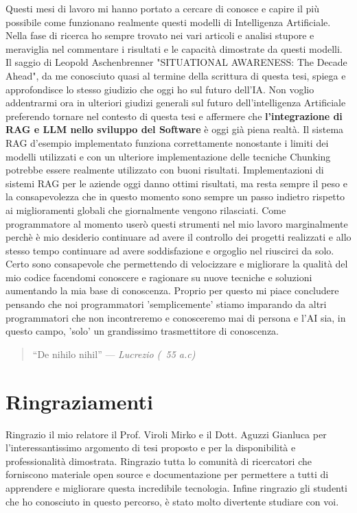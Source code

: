 \documentclass[12pt,a4paper,openright,twoside]{book}
\begin{document}
Questi mesi di lavoro mi hanno portato a cercare di conosce e capire il più possibile come funzionano realmente questi modelli di Intelligenza Artificiale.
Nella fase di ricerca ho sempre trovato nei vari articoli e analisi stupore e meraviglia nel commentare i risultati e le capacità dimostrate da questi modelli.
Il saggio di Leopold Aschenbrenner \cite{Aschenbrenner2024} "SITUATIONAL AWARENESS: The Decade Ahead", da me conosciuto quasi al termine della scrittura di questa tesi, spiega e approfondisce lo stesso giudizio che oggi ho sul futuro dell'IA.
Non voglio addentrarmi ora in ulteriori giudizi generali sul futuro dell'intelligenza Artificiale preferendo tornare nel contesto di questa tesi e affermere che \textbf{l'integrazione di RAG e LLM nello sviluppo del Software} è oggi già piena realtà.
Il sistema RAG d'esempio implementato funziona correttamente nonostante i limiti dei modelli utilizzati e con un ulteriore implementazione delle tecniche Chunking potrebbe essere realmente utilizzato con buoni risultati.
Implementazioni di sistemi RAG per le aziende oggi danno ottimi risultati,
ma resta sempre il peso e la consapevolezza che in questo momento sono sempre un passo indietro rispetto ai miglioramenti globali che
giornalmente vengono rilasciati.
Come programmatore al momento userò questi strumenti nel mio lavoro marginalmente perchè è mio desiderio continuare ad avere il controllo dei progetti realizzati e allo stesso tempo continuare ad avere soddisfazione e orgoglio nel riuscirci da solo.
Certo sono consapevole che permettendo di velocizzare e migliorare la qualità del mio codice facendomi conoscere e ragionare su nuove tecniche e soluzioni aumentando la mia base di conoscenza.
Proprio per questo mi piace concludere pensando che noi programmatori 'semplicemente' stiamo imparando da altri programmatori che non incontreremo e conosceremo mai di persona e l'AI sia, in questo campo, 'solo' un grandissimo trasmettitore di conoscenza.

\begin{quote}
    “De nihilo nihil”
    \hfill--- \textit{Lucrezio (~55 a.c) }
\end{quote}

\chapter{Ringraziamenti}
Ringrazio il mio relatore il Prof. Viroli Mirko e il Dott. Aguzzi Gianluca per l'interessantissimo argomento di tesi proposto e per la disponibilità e professionalità dimostrata.
Ringrazio tutta lo comunità di ricercatori che forniscono materiale open source e documentazione per permettere a tutti di apprendere e migliorare questa incredibile tecnologia.
Infine ringrazio gli studenti che ho conosciuto in questo percorso, è stato molto divertente studiare con voi.
\end{document}
